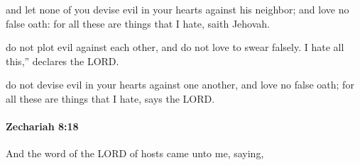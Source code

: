 			\begin{versebox}
					\item[BHS] 
					\item[LXX] 
					\item[ASV] and let none of you devise evil in your hearts against his neighbor; and love no false oath: for all these are things that I hate, saith Jehovah.
					\item[NIV] do not plot evil against each other, and do not love to swear falsely. I hate all this,” declares the LORD.
					\item[NRSV] do not devise evil in your hearts against one another, and love no false oath; for all these are things that I hate, says the LORD.
			\end{versebox}

		\paragraph{Zechariah 8:18} %
			\label{ZECHARIAH-8-18}

			And the word of the LORD of hosts came unto me, saying,

